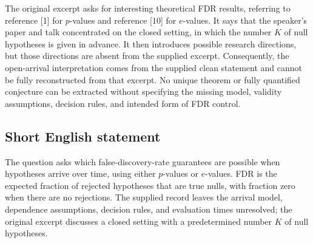 \documentclass[11pt]{article}
\begin{document}
The original excerpt asks for interesting theoretical FDR results, referring to reference [1] for \(p\)-values and reference [10] for \(e\)-values. It says that the speaker's paper and talk concentrated on the closed setting, in which the number \(K\) of null hypotheses is given in advance. It then introduces possible research directions, but those directions are absent from the supplied excerpt. Consequently, the open-arrival interpretation comes from the supplied clean statement and cannot be fully reconstructed from that excerpt. No unique theorem or fully quantified conjecture can be extracted without specifying the missing model, validity assumptions, decision rules, and intended form of FDR control.
\subsection{Short English statement}
The question asks which false-discovery-rate guarantees are possible when hypotheses arrive over time, using either \(p\)-values or \(e\)-values. FDR is the expected fraction of rejected hypotheses that are true nulls, with fraction zero when there are no rejections. The supplied record leaves the arrival model, dependence assumptions, decision rules, and evaluation times unresolved; the original excerpt discusses a closed setting with a predetermined number \(K\) of null hypotheses.
\end{document}
